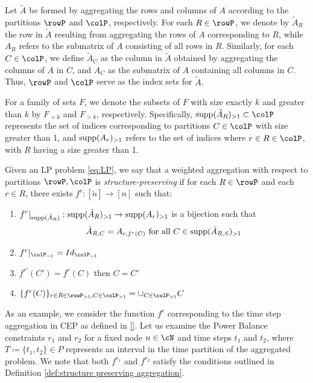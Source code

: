 {Let \(\tilde{A}\) be formed by aggregating the rows and columns of \(A\) according to the partitions \(\rowP\) and \(\colP\), respectively. 
For each \(R \in \rowP\), we denote by \(\tilde{A}_R\) the row in \(\tilde{A}\) resulting from aggregating the rows of \(A\) corresponding to \(R\), 
while \(A_R\) refers to the submatrix of \(A\) consisting of all rows in \(R\). 
Similarly, for each \(C \in \colP\), we define \(\tilde{A}_C\) as the column in \(\tilde{A}\) obtained by aggregating the columns of \(A\) in \(C\), 
and \(A_C\) as the submatrix of \(A\) containing all columns in \(C\). 
Thus, \(\rowP\) and \(\colP\) serve as the index sets for \(\tilde{A}\).

For a family of sets \(F\), we denote the subsets of \(F\) with size exactly \(k\) and greater than \(k\) 
by \(F_{=k}\) and \(F_{>k}\), respectively. 
Specifically, \(\supp(\tilde{A}_R)_{>1} \subset \colP\) represents the set of indices corresponding to partitions 
\(C \in \colP\) with size greater than 1, and \(\operatorname{supp}(A_r)_{>1}\) refers to the set of indices where 
\(r \in R \in \colP\), with \(R\) having a size greater than 1.

\begin{definition}
  \label{def:structure preserving aggregation}
  Given an LP problem \eqref{eq:LP}, we say that a weighted aggregation with respect to partitions \(\rowP, \colP\) is \emph{structure-preserving} if for each \(R \in \rowP\) and each \(r \in R\), there exists \(f^r: [\tilde{n}] \to [n]\)  such that:
  \begin{enumerate}
    \item \( f^r|_{\operatorname{supp}(\tilde{A}_{R})}: \operatorname{supp}(\tilde{A}_{R})_{>1} \to \operatorname{supp}(A_{r})_{>1}\) is a bijection such that
    \[\tilde{A}_{R,C} = A_{r,f^r(C)} \text{ for all } C \in \operatorname{supp}(\tilde{A}_{R,S})_{>1}\]
    \item \(f^r|_{\colP_{=1}} = Id_{\colP_{=1}}\)
    \item \(f^{r'}(C') = f^r(C)\) then \( C=C'\)
    \item \(\{f^r(C)\}_{r\in R \in \rowP_{>1}, C \in \colP_{>1}} = \cup_{C \in \colP_{>1}}C\)
  \end{enumerate}
\end{definition}

{
\color{black}

\begin{example}
  As an example, we consider the function \(f^r\) corresponding to the time step aggregation in CEP as defined in \textcolor{green}{\ref{}}. 
  Let us examine the Power Balance constraints \(r_1\) and \(r_2\) for a fixed node \(n \in \cN\) and time steps \(t_1\) and \(t_2\), 
  where \(T \coloneqq \{t_1, t_2\} \in P\) represents an interval in the time partition of the aggregated problem. 
  We note that both \(f^{r_1}\) and \(f^{r_2}\) satisfy the conditions outlined in Definition \ref{def:structure preserving aggregation}. 
  

\end{example}}}
